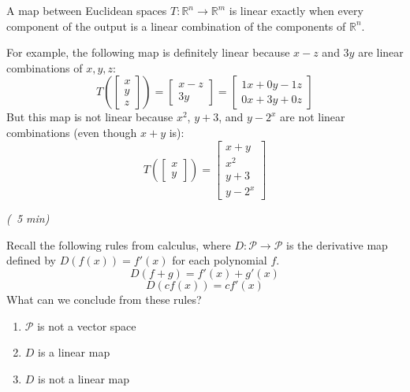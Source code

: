 \documentclass[10pt,]{book}
\theoremstyle{ptxplainnotitle}
\theoremstyle{ptxplaintitle}
\theoremstyle{ptxdefinitionnotitle}
\theoremstyle{ptxdefinitiontitle}
\theoremstyle{ptxdefinitionnotitle}
\theoremstyle{ptxdefinitiontitle}
\theoremstyle{ptxdefinitionnotitle}
\theoremstyle{ptxdefinitiontitle}
\theoremstyle{ptxdefinitionnotitle}
\theoremstyle{ptxdefinitiontitle}
\newcommand{\IR}{\mathbb{R}}
\newcommand{\Poly}{\mathcal{P}}
\begin{document}
\begin{fact}\label{fact-1}
\hypertarget{p-14}{}%
A map between Euclidean spaces \(T:\IR^n\to\IR^m\) is linear exactly when every component of the output is a linear combination of the components of \(\IR^n\).%
\par
\hypertarget{p-15}{}%
For example, the following map is definitely linear because \(x-z\) and \(3y\) are linear combinations of \(x,y,z\):%
%
\begin{equation*}
T\left(\begin{bmatrix} x \\ y \\ z \end{bmatrix} \right)
=
\begin{bmatrix} x-z \\ 3y \end{bmatrix}
=
\begin{bmatrix} 1x+0y-1z \\ 0x+3y+0z \end{bmatrix}
\end{equation*}
\hypertarget{p-16}{}%
But this map is not linear because \(x^2\), \(y+3\), and \(y-2^x\) are not linear combinations (even though \(x+y\) is):%
%
\begin{equation*}
T\left(\begin{bmatrix} x \\ y \end{bmatrix} \right)
=
\begin{bmatrix} x+y \\ x^2 \\ y+3 \\ y-2^x \end{bmatrix}
\end{equation*}
\end{fact}
\begin{activity}\label{activity-1}
\hypertarget{p-17}{}%
\emph{(~5 min)}%
\par
\hypertarget{p-18}{}%
Recall the following rules from calculus, where \(D:\Poly\to\Poly\) is the derivative map defined by \(D(f(x))=f'(x)\) for each polynomial \(f\).%
%
\begin{equation*}
D(f+g)=f'(x)+g'(x)
\end{equation*}
%
\begin{equation*}
D(cf(x))=cf'(x)
\end{equation*}
\hypertarget{p-19}{}%
What can we conclude from these rules?%
\leavevmode%
\begin{enumerate}[label=\Alph*]
\item\hypertarget{li-3}{}\(\Poly\) is not a vector space%
\item\hypertarget{li-4}{}\(D\) is a linear map%
\item\hypertarget{li-5}{}\(D\) is not a linear map%
\end{enumerate}
\end{activity}
\end{document}
